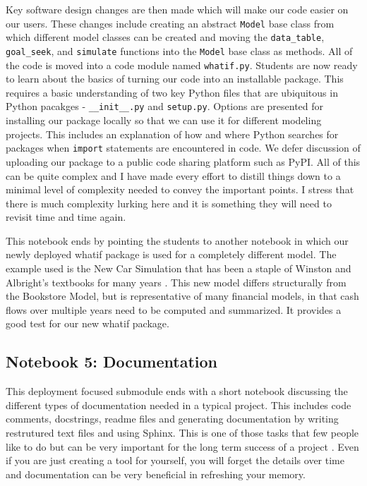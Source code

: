 \documentclass[ited,blindrev]{informs3}              %
\newcommand{\code}[1]{\texttt{#1}}
\begin{document}
Key software design changes are then made which will make our code easier on our users. These changes include creating an abstract \code{Model} base class from which different model classes can be created and moving the \code{data\_table}, \code{goal\_seek}, and \code{simulate} functions into the \code{Model} base class as methods. All of the code is moved into a code module named \code{whatif.py}. Students are now ready to learn about the basics of turning our code into an installable package. This requires a basic understanding of two key Python files that are ubiquitous in Python pacakges - \code{\_\_init\_\_.py} and \code{setup.py}. Options are presented for installing our package locally so that we can use it for different modeling projects. This includes an explanation of how and where Python searches for packages when \code{import} statements are encountered in code. We defer discussion of uploading our package to a public code sharing platform such as PyPI. All of this can be quite complex and I have made every effort to distill things down to a minimal level of complexity needed to convey the important points. I stress that there is much complexity lurking here and it is something they will need to revisit time and time again.

This notebook ends by pointing the students to another notebook in which our newly deployed whatif package is used for a completely different model. The example used is the New Car Simulation that has been a staple of Winston and Albright's textbooks for many years \cite{bibid}. This new model differs structurally from the Bookstore Model, but is representative of many financial models, in that cash flows over multiple years need to be computed and summarized. It provides a good test for our new whatif package. 

\subsection{Notebook 5: Documentation}

This deployment focused submodule ends with a short notebook discussing the different types of documentation needed in a typical project. This includes code comments, docstrings, readme files and generating documentation by writing restrutured text files and using Sphinx. This is one of those tasks that few people like to do but can be very important for the long term success of a project \cite{bibid}. Even if you are just creating a tool for yourself, you will forget the details over time and documentation can be very beneficial in refreshing your memory. 
\end{document}
